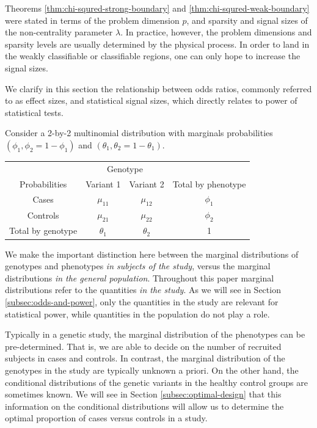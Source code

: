 
Theorems \ref{thm:chi-squred-strong-boundary} and \ref{thm:chi-squred-weak-boundary} were stated in terms of the problem dimension $p$, and sparsity and signal sizes of the non-centrality parameter $\lambda$.
In practice, however, the problem dimensions and sparsity levels are usually determined by the physical process.
In order to land in the weakly classifiable or classifiable regions, one can only hope to increase the signal sizes.

We clarify in this section the relationship between odds ratios, commonly referred to as effect sizes, and statistical signal sizes, which directly relates to power of statistical tests.

Consider a 2-by-2 multinomial distribution with marginals probabilities $(\phi_1, \phi_2 = 1-\phi_1)$ and $(\theta_1, \theta_2 = 1-\theta_1)$.
\begin{center}
    \begin{tabular}{cccc}
    \hline
    & \multicolumn{2}{c}{Genotype} \\
    \cline{2-3}
    Probabilities & Variant 1 & Variant 2 & Total by phenotype \\
    \hline
    Cases & $\mu_{11}$ & $\mu_{12}$ & $\phi_1$ \\
    Controls & $\mu_{21}$ & $\mu_{22}$ & $\phi_2$ \\
    Total by genotype & $\theta_1$ & $\theta_2$ & 1 \\
    \hline
    \end{tabular}
\end{center}

We make the important distinction here between the marginal distributions of genotypes and phenotypes \emph{in subjects of the study}, versus the marginal distributions \emph{in the general population}.
Throughout this paper marginal distributions refer to the quantities \emph{in the study}.
As we will see in Section \ref{subsec:odds-and-power}, only the quantities in the study are relevant for statistical power, while quantities in the population do not play a role.

Typically in a genetic study, the marginal distribution of the phenotypes can be pre-determined.
That is, we are able to decide on the number of recruited subjects in cases and controls.
In contrast, the marginal distribution of the genotypes in the study are typically unknown a priori. 
On the other hand, the conditional distributions of the genetic variants in the healthy control groups are sometimes known.
We will see in Section \ref{subsec:optimal-design} that this information on the conditional distributions will allow us to determine the optimal proportion of cases versus controls in a study.


